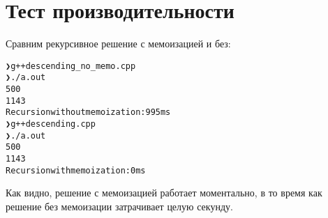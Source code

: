\section{Тест производительности}


Сравним рекурсивное решение с мемоизацией и без:

\begin{alltt}
❯ g++ descending_no_memo.cpp
❯ ./a.out
500
1143
Recursion without memoization: 995ms
❯ g++ descending.cpp
❯ ./a.out
500
1143
Recursion with memoization: 0ms
\end{alltt}

Как видно, решение с мемоизацией работает моментально, в то время как решение без мемоизации затрачивает целую секунду.


\pagebreak

